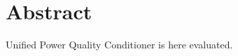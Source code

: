 
\section*{Abstract}

\medskip

Unified Power Quality Conditioner is here evaluated.




\vspace{100pt} %